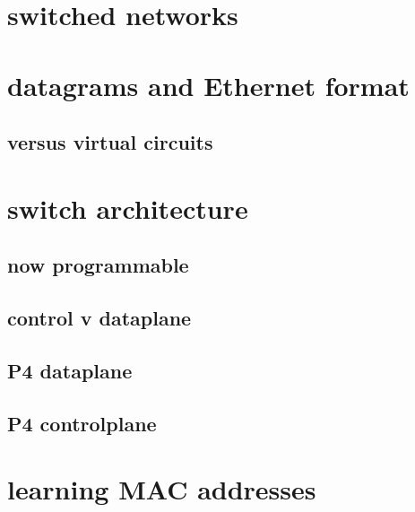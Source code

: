 \date{}
\title{}
\date{}

\begin{frame}
    \titlepage
\end{frame}

\section{switched networks}



\section{datagrams and Ethernet format}



\subsection{versus virtual circuits}



\section{switch architecture}

\subsection{now programmable}


\subsection{control v dataplane}


\subsection{P4 dataplane}


\subsection{P4 controlplane}


\section{learning MAC addresses}

